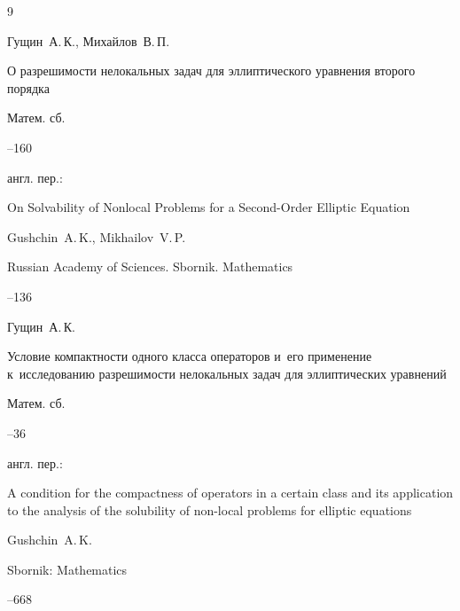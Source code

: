\begin{thebibliography}{9}
 


\by Гущин~А.\,К., Михайлов~В.\,П.

\paper О разрешимости нелокальных задач для эллиптического уравнения второго порядка

\jour Матем. сб.




--160

\transl англ. пер.:

\paper On Solvability of Nonlocal Problems for a Second-Order Elliptic Equation

\by Gushchin~A.\,K., Mikhailov~V.\,P.

\jour Russian Academy of Sciences. Sbornik. Mathematics




--136

    


\by Гущин~А.\,К.

\paper Условие компактности одного класса операторов и~его применение к~исследованию разрешимости нелокальных задач для эллиптических уравнений

\jour Матем. сб.




--36

\transl англ. пер.:

\paper 

A condition for the compactness of operators in a certain class and its application to the analysis of the solubility of non-local problems for elliptic equations

\by Gushchin~A.\,K.

\jour Sbornik: Mathematics




--668



\end{thebibliography}









\makeengtitle




%


%

%